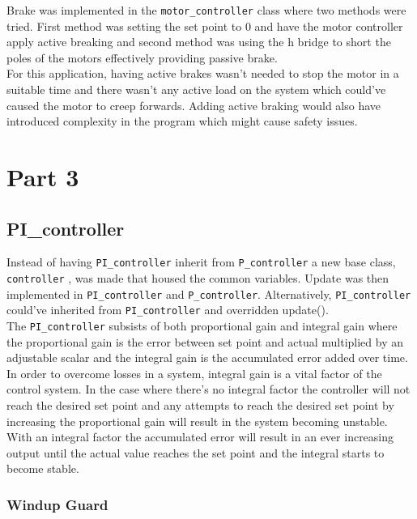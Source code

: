 \documentclass{article}
\begin{document}
Brake was implemented in the \verb!motor_controller! class where two methods were tried. First method was setting the set point to 0 and have the motor controller apply active breaking and second method was using the h bridge to short the poles of the motors effectively providing passive brake. 
\\
For this application, having active brakes wasn't needed to stop the motor in a suitable time and there wasn't any active load on the system which could've caused the motor to creep forwards. Adding active braking would also have introduced complexity in the program which might cause safety issues.



\section{Part 3}

\subsection{PI\_controller}
Instead of having \verb!PI_controller! inherit from \verb!P_controller! a new base class, \verb!controller! , was made that housed the common variables. Update was then implemented in \verb!PI_controller! and \verb!P_controller!. Alternatively, \verb!PI_controller! could've inherited from \verb!PI_controller! and overridden update().
\\
The \verb!PI_controller! subsists of both proportional gain and integral gain where the proportional gain is the error between set point and actual multiplied by an adjustable scalar and the integral gain is the accumulated error added over time.
\\
In order to overcome losses in a system, integral gain is a vital factor of the control system. In the case where there's no integral factor the controller will not reach the desired set point and any attempts to reach the desired set point by increasing the proportional gain will result in the system becoming unstable.
\\
With an integral factor the accumulated error will result in an ever increasing output until the actual value reaches the set point and the integral starts to become stable.

\subsubsection{Windup Guard}
\end{document}
